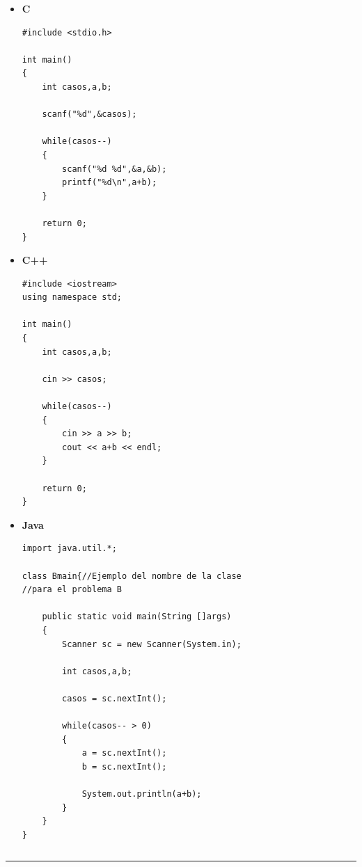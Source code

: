 \begin{multicols}{2}
\begin{itemize}

\item \bf{C}

    \begin{verbatim}
#include <stdio.h>

int main()
{
    int casos,a,b;
	
    scanf("%d",&casos);
	
    while(casos--)
    {
        scanf("%d %d",&a,&b);
        printf("%d\n",a+b);
    }
	
    return 0;
}    
	\end{verbatim}
    
\item \bf{C++}

    \begin{verbatim}
#include <iostream>
using namespace std;

int main()
{
    int casos,a,b;

    cin >> casos;

    while(casos--)
    {
        cin >> a >> b;
        cout << a+b << endl;
    }

    return 0;
}
	\end{verbatim}
 

\item \bf{Java}

    \begin{verbatim}
import java.util.*;

class Bmain{//Ejemplo del nombre de la clase
//para el problema B

    public static void main(String []args)
    {
        Scanner sc = new Scanner(System.in);
        
        int casos,a,b;
        
        casos = sc.nextInt();
        
        while(casos-- > 0)
        {
            a = sc.nextInt();
            b = sc.nextInt();
            
            System.out.println(a+b);
        }
    }
}
    \end{verbatim}
\end{itemize}

$$$$
$$$$
$$$$
$$$$
$$$$

\end{multicols}


\noindent \rule[0.5ex]{1\columnwidth}{1pt}


